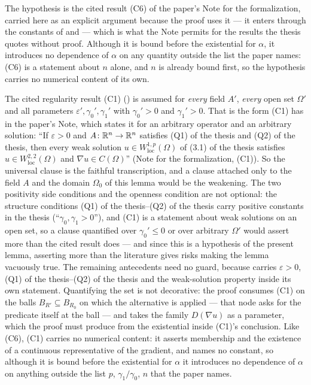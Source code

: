 \begin{lemma}
The hypothesis  is the cited result (C6) of
the paper's Note for the formalization, carried here as an explicit argument
because the proof uses it --- it enters through the constants of
 and  --- which is
what the Note permits for the results the thesis quotes without proof.  Although
it is bound before the existential for $\alpha$, it introduces no dependence of
$\alpha$ on any quantity outside the list the paper names: (C6) is a statement
about $n$ alone, and $n$ is already bound first, so the hypothesis carries no
numerical content of its own.

The cited regularity result (C1) () is assumed
for \emph{every} field $A'$, \emph{every} open set $\Omega'$ and all parameters
$\varepsilon',\gamma_0',\gamma_1'$ with $\gamma_0'>0$ and $\gamma_1'>0$.  That
is the form (C1) has in the paper's Note, which states it for an arbitrary
operator and an arbitrary solution: ``If $\varepsilon>0$ and
$A\colon\mathbb{R}^n\to\mathbb{R}^n$ satisfies (Q1) of the thesis and (Q2) of the thesis, then every weak
solution $u\in W^{1,p}_{\mathrm{loc}}(\Omega)$ of (3.1) of the thesis satisfies
$u\in W^{2,2}_{\mathrm{loc}}(\Omega)$ and $\nabla u\in C(\Omega)$'' (Note for
the formalization, (C1)).  So the universal clause is the faithful
transcription, and a clause attached only to the field $A$ and the domain
$\Omega_0$ of this lemma would be the weakening.  The two positivity side
conditions and the openness condition are not optional: the structure conditions
(Q1) of the thesis--(Q2) of the thesis carry positive constants in the thesis
(``$\gamma_0,\gamma_1>0$''), and (C1) is a statement about weak solutions on an
open set, so a clause quantified over $\gamma_0'\le0$ or over arbitrary
$\Omega'$ would assert more than the cited result does --- and since this is a
hypothesis of the present lemma, asserting more than the literature gives risks
making the lemma vacuously true.  The remaining antecedents need no guard,
because  carries $\varepsilon>0$,
(Q1) of the thesis--(Q2) of the thesis and the weak-solution property inside its own
statement.  Quantifying the set is not decorative: the proof consumes (C1) on
the balls $B_{R'}\subseteq B_{R_0}$ on which the alternative
 is applied --- that node asks for the predicate
itself at the ball --- and  takes the family
$D(\nabla u)$ as a parameter, which the proof must produce from the existential
inside (C1)'s conclusion.  Like (C6), (C1) carries no numerical content: it
asserts membership and the existence of a continuous representative of the
gradient, and names no constant, so although it is bound before the existential
for $\alpha$ it introduces no dependence of $\alpha$ on anything outside the
list $p$, $\gamma_1/\gamma_0$, $n$ that the paper names.
\end{lemma}
